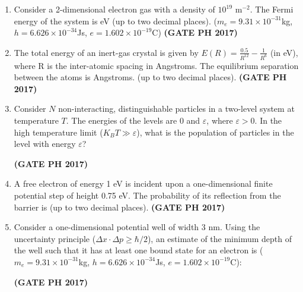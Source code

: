 \documentclass[14pt, a4paper]{extarticle}
\begin{document}
\begin{enumerate}[label=\textbf{Q.\arabic*}]
\item Consider a 2-dimensional electron gas with a density of $10^{19}$ m$^{-2}$. The Fermi energy of the system is \underline{\hspace{3cm}} eV (up to two decimal places). ($m_e=9.31\times10^{-31}$kg, $h=6.626\times10^{-34}$Js, $e=1.602\times10^{-19}$C)
\hfill \textbf{(GATE PH 2017)}

\item The total energy of an inert-gas crystal is given by $E(R) = \frac{0.5}{R^{12}} - \frac{1}{R^6}$ (in eV), where R is the inter-atomic spacing in Angstroms. The equilibrium separation between the atoms is \underline{\hspace{3cm}} Angstroms. (up to two decimal places).
\hfill \textbf{(GATE PH 2017)}

\item Consider $N$ non-interacting, distinguishable particles in a two-level system at temperature $T$. The energies of the levels are 0 and $\varepsilon$, where $\varepsilon > 0$. In the high temperature limit ($K_B T \gg \varepsilon$), what is the population of particles in the level with energy $\varepsilon$?
\begin{enumerate}
\end{enumerate}
\hfill \textbf{(GATE PH 2017)}

\item A free electron of energy 1 eV is incident upon a one-dimensional finite potential step of height 0.75 eV. The probability of its reflection from the barrier is \underline{\hspace{3cm}} (up to two decimal places).
\hfill \textbf{(GATE PH 2017)}

\item Consider a one-dimensional potential well of width 3 nm. Using the uncertainty principle ($\Delta x \cdot \Delta p \geq \hbar/2$), an estimate of the minimum depth of the well such that it has at least one bound state for an electron is ($m_e=9.31\times10^{-31}$kg, $h=6.626\times10^{-34}$Js, $e=1.602\times10^{-19}$C):
\begin{enumerate}
\end{enumerate}
\hfill \textbf{(GATE PH 2017)}


\end{enumerate}
\end{document}

